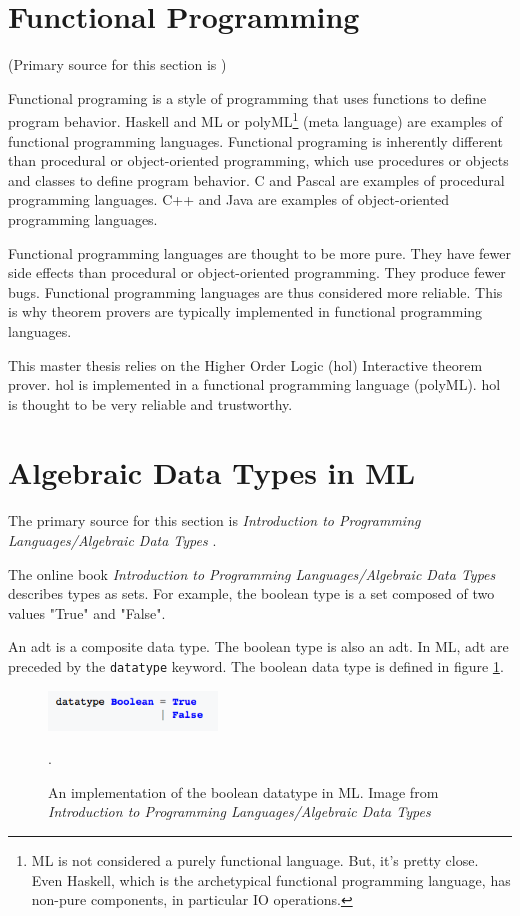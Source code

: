 \documentclass[../../main/main.tex]{subfiles}
\begin{document}
\section{Functional Programming}
(Primary source for this section is \cite{functionalprogramming})

Functional programing is a style of programming that uses functions to define program behavior.  Haskell and ML or polyML\footnote{ML is not considered a purely functional language.  But, it's pretty close.  Even Haskell, which is the archetypical functional programming language, has non-pure components, in particular IO operations.} (meta language) are examples of functional programming languages.  Functional programing is inherently different than procedural or object-oriented programming, which use procedures or objects and classes to define program behavior.  C  and Pascal are examples of procedural programming languages.  C++ and Java are examples of object-oriented programming languages.    

Functional programming languages are thought to be more pure.  They have fewer side effects than procedural or object-oriented programming.  They produce fewer bugs.  Functional programming languages are thus considered more reliable. This is why theorem provers are typically implemented in functional programming languages.  

This master thesis relies on the Higher Order Logic (\gls{hol}) Interactive theorem prover.  \gls{hol} is implemented in a functional programming language (polyML).  \gls{hol} is thought to be very reliable and trustworthy.

\section{Algebraic Data Types in ML}\label{adt}\label{sec:adtinml}
The primary source for this section is \textit{Introduction to Programming Languages/Algebraic  Data Types} \cite{types}.  

The online book \textit{Introduction to Programming Languages/Algebraic  Data Types} describes types as sets.  For example, the boolean type is a set composed of two values "True" and "False".  

An \gls{adt} is a composite data type.  The boolean type is also an \gls{adt}.  In ML, \gls{adt} are preceded by the \texttt{datatype} keyword.  The boolean data type is defined in figure \ref{booladt}.
  

\begin{figure}[h]
\centering
\includegraphics[width=0.4\textwidth]{../figures/booladt}
\caption{\label{booladt} An implementation of the boolean datatype in ML.  Image from \textit{Introduction to Programming Languages/Algebraic Data Types} \cite{types} }.  
\end{figure}
\end{document}
